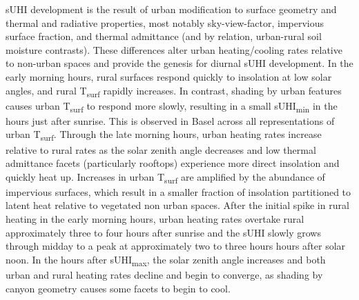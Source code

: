 \begin{bibunit}
sUHI development is the result of urban modification to surface geometry and thermal and radiative properties, most notably sky-view-factor, impervious surface fraction, and thermal admittance (and by relation, urban-rural soil moisture contrasts). These differences alter urban heating/cooling rates relative to non-urban spaces and provide the genesis for diurnal sUHI development. In the early morning hours, rural surfaces respond quickly to insolation at low solar angles, and rural T\textsubscript{surf} rapidly increases. In contrast, shading by urban features causes urban T\textsubscript{surf} to respond more slowly, resulting in a small sUHI\textsubscript{min} in the hours just after sunrise. This is observed in Basel across all representations of urban T\textsubscript{surf}. Through the late morning hours, urban heating rates increase relative to rural rates as the solar zenith angle decreases and low thermal admittance facets (particularly rooftops) experience more direct insolation and quickly heat up. Increases in urban T\textsubscript{surf} are amplified by the abundance of impervious surfaces, which result in a smaller fraction of insolation partitioned to latent heat relative to vegetated non urban spaces. After the initial spike in rural heating in the early morning hours, urban heating rates overtake rural approximately three to four hours after sunrise and the sUHI slowly grows through midday to a peak at approximately two to three hours hours after solar noon. In the hours after sUHI\textsubscript{max}, the solar zenith angle increases and both urban and rural heating rates decline and begin to converge, as shading by canyon geometry causes some facets to begin to cool.


\end{bibunit}
